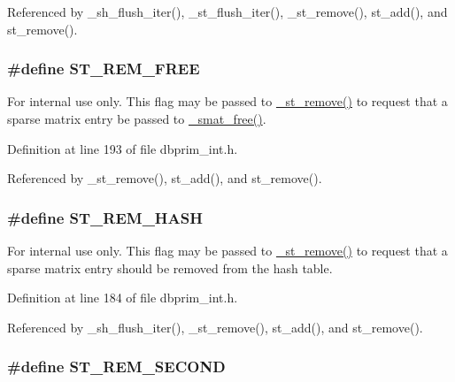 Referenced by \_\-sh\_\-flush\_\-iter(), \_\-st\_\-flush\_\-iter(), \_\-st\_\-remove(), st\_\-add(), and st\_\-remove().\hypertarget{group__dbprim__smat_ga69}{
\subsubsection[ST\_\-REM\_\-FREE]{\setlength{\rightskip}{0pt plus 5cm}\#define ST\_\-REM\_\-FREE}}
\label{group__dbprim__smat_ga69}


\begin{Desc}
\item[For internal use only.]
This flag may be passed to \hyperlink{group__dbprim__smat_ga24}{\_\-st\_\-remove()} to request that a sparse matrix entry be passed to \hyperlink{group__dbprim__smat_ga26}{\_\-smat\_\-free()}.\end{Desc}


Definition at line 193 of file dbprim\_\-int.h.

Referenced by \_\-st\_\-remove(), st\_\-add(), and st\_\-remove().\hypertarget{group__dbprim__smat_ga68}{
\subsubsection[ST\_\-REM\_\-HASH]{\setlength{\rightskip}{0pt plus 5cm}\#define ST\_\-REM\_\-HASH}}
\label{group__dbprim__smat_ga68}


\begin{Desc}
\item[For internal use only.]
This flag may be passed to \hyperlink{group__dbprim__smat_ga24}{\_\-st\_\-remove()} to request that a sparse matrix entry should be removed from the hash table.\end{Desc}


Definition at line 184 of file dbprim\_\-int.h.

Referenced by \_\-sh\_\-flush\_\-iter(), \_\-st\_\-remove(), st\_\-add(), and st\_\-remove().\hypertarget{group__dbprim__smat_ga67}{
\subsubsection[ST\_\-REM\_\-SECOND]{\setlength{\rightskip}{0pt plus 5cm}\#define ST\_\-REM\_\-SECOND}}
\label{group__dbprim__smat_ga67}


